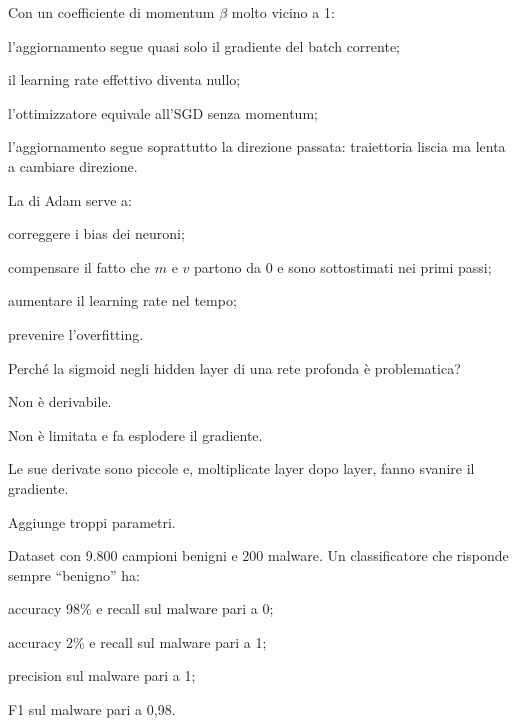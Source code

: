 \begin{domanda}[momentum]\label{quiz:m11}
Con un coefficiente di momentum $\beta$ molto vicino a 1:
\begin{opzioni}
  \item l'aggiornamento segue quasi solo il gradiente del batch corrente;
  \item il learning rate effettivo diventa nullo;
  \item l'ottimizzatore equivale all'SGD senza momentum;
  \item l'aggiornamento segue soprattutto la direzione passata: traiettoria liscia ma lenta a cambiare direzione.
\end{opzioni}
\end{domanda}

\begin{domanda}[Adam]\label{quiz:m12}
La  di Adam serve a:
\begin{opzioni}
  \item correggere i bias dei neuroni;
  \item compensare il fatto che $m$ e $v$ partono da 0 e sono sottostimati nei primi passi;
  \item aumentare il learning rate nel tempo;
  \item prevenire l'overfitting.
\end{opzioni}
\end{domanda}

\begin{domanda}\label{quiz:m13}
Perché la sigmoid negli hidden layer di una rete profonda è problematica?
\begin{opzioni}
  \item Non è derivabile.
  \item Non è limitata e fa esplodere il gradiente.
  \item Le sue derivate sono piccole e, moltiplicate layer dopo layer, fanno svanire il gradiente.
  \item Aggiunge troppi parametri.
\end{opzioni}
\end{domanda}

\begin{domanda}[metriche]\label{quiz:m14}
Dataset con 9.800 campioni benigni e 200 malware. Un classificatore che risponde sempre ``benigno'' ha:
\begin{opzioni}
  \item accuracy 98\% e recall sul malware pari a 0;
  \item accuracy 2\% e recall sul malware pari a 1;
  \item precision sul malware pari a 1;
  \item F1 sul malware pari a 0,98.
\end{opzioni}
\end{domanda}

